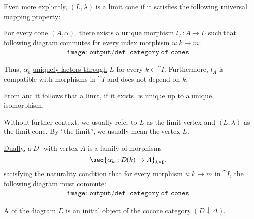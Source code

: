 \begin{definition}
\begin{thmenum}
    Even more explicitly, \( (L, \lambda) \) is a limit cone if it satisfies the following \hyperref[rem:limit_universal_mapping_property]{universal mapping property}:
    \begin{displayquote}
      For every cone \( (A, \alpha) \), there exists a unique morphism \( l_A: A \to L \) such that following diagram commutes for every index morphism \( u: k \to m \):
      \begin{equation}\label{eq:def:category_of_cones/limit}
        \begin{aligned}
          \texttt{[image: output/def\_\_category\_of\_cones]}
        \end{aligned}
      \end{equation}
    \end{displayquote}

    Thus, \( \alpha_k \) \hyperref[def:factors_through]{uniquely factors through} \( L \) for every \( k \in \cat{I} \). Furthermore, \( l_A \) is compatible with morphisms in \( \cat{I} \) and does not depend on \( k \).

    From  and  it follows that a limit, if it exists, is unique up to a unique isomorphism.

    Without further context, we usually refer to \( L \) as the limit vertex and \( (L, \lambda) \) as the limit cone. By \enquote{the limit}, we usually mean the vertex \( L \).

     \hyperref[thm:categorical_principle_of_duality]{Dually}, a \( D \)- with vertex \( A \) is a family of morphisms
    \begin{equation}\label{eq:def:category_of_cones/cocone}
      \seq{ \alpha_k: D(k) \to A }_{k \in \cat{I}}.
    \end{equation}
    satisfying the naturality condition that for every morphism \( u: k \to m \) in \( \cat{I} \), the following diagram must commute:
    \begin{equation}\label{eq:def:category_of_cones/cocone_nat}
      \begin{aligned}
        \texttt{[image: output/def\_\_category\_of\_cones]}
      \end{aligned}
    \end{equation}

     A  of the diagram \( D \) is an \hyperref[def:universal_objects/initial]{initial object} of the cocone category \( (D \downarrow \Delta) \).


\end{thmenum}
\end{definition}
